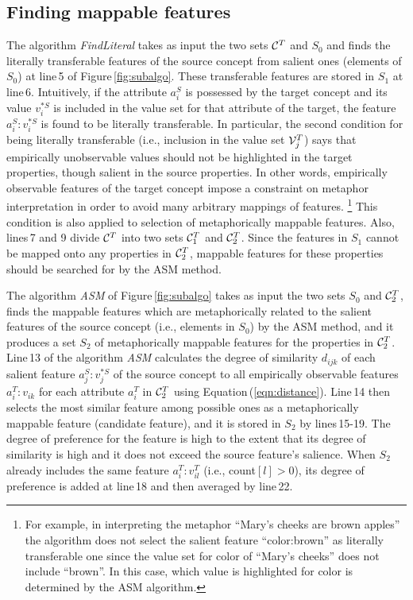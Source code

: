 \subsection{Finding mappable features}
The algorithm {\it FindLiteral\/} takes as input the two sets ${\cal C}^T$ and $S_0$
and finds the literally transferable features of the source concept 
from salient ones (elements of $S_0$) at line\,5 of Figure\,\ref{fig:subalgo}.
These transferable features are stored in $S_1$ at line\,6.
Intuitively, if the attribute $a^S_i$ is possessed by the target concept and 
its value $v^{*S}_i$ is included in the value set for that attribute of
the target, the feature $a^S_i\!:\!v^{*S}_i$ is found to be literally transferable.
In particular, the second condition for being literally transferable 
(i.e., inclusion in the value set ${\cal V}^T_j$) says that 
empirically unobservable values should not be highlighted in the target properties,
though salient in the source properties.
In other words, empirically observable features of the target concept impose 
a constraint on metaphor interpretation in order to avoid many arbitrary mappings of features. 
\footnote{
  For example, in interpreting the metaphor ``Mary's cheeks are brown apples''
  the algorithm does not select the salient feature ``color:brown'' as literally 
  transferable one since the value set for color of ``Mary's cheeks'' does not include ``brown''.
  In this case, which value is highlighted for color is determined by the ASM algorithm.}
This condition is also applied to selection of metaphorically mappable features.
Also, lines\,7 and 9 divide ${\cal C}^T$ into two sets ${\cal C}^T_1$ and ${\cal C}^T_2$.
Since the features in $S_1$ cannot be mapped onto any properties in ${\cal C}^T_2$,
mappable features for these properties should be searched for by the ASM method.

The algorithm {\it ASM\/} of Figure\,\ref{fig:subalgo} 
takes as input the two sets $S_0$ and ${\cal C}^T_2$,
finds the mappable features which are metaphorically 
related to the salient features of the source concept (i.e., elements in $S_0$)
by the ASM method,
and it produces a set $S_2$ of metaphorically mappable features 
for the properties in ${\cal C}^T_2$.
Line\,13 of the algorithm {\it ASM\/} calculates the degree of similarity $d_{ijk}$
of each salient feature $a^S_j\!:\!v^{*S}_j$ of the source concept to 
all empirically observable features $a^T_i\!:\!v_{ik}$ for each attribute
$a^T_i$ in ${\cal C}^T_2$ using Equation\,(\ref{eqn:distance}). 
Line\,14 then selects the most similar feature among possible ones
as a metaphorically mappable feature (candidate feature), 
and it is stored in $S_2$ by lines\,15-19. 
The degree of preference for the feature is high
to the extent that its degree of similarity is high and 
it does not exceed the source feature's salience.
When $S_2$ already includes the same feature $a^T_i\!\!:\!v^T_{il}$
(i.e., count$[l]>0$), its degree of preference
is added at line\,18 and then averaged by line\,22.

